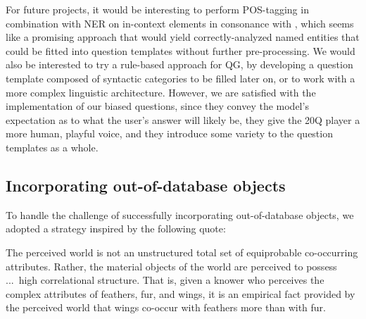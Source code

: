 \documentclass[11pt,a4paper]{article}
\begin{document}
For future projects, it would be interesting to perform POS-tagging in combination with NER on in-context elements in consonance with \citet{Mandasari2019}, which seems like a promising approach that would yield correctly-analyzed named entities that could be fitted into question templates without further pre-processing. We would also be interested to try a rule-based approach for QG, by developing a question template composed of syntactic categories to be filled later on, or to work with a more complex linguistic architecture. However, we are satisfied with the implementation of our biased questions, since they convey the model's expectation as to what the user's answer will likely be, they give the 20Q player a more human, playful voice, and they introduce some variety to the question templates as a whole.

\subsection{Incorporating out-of-database objects}
\label{subsec:out-of-db}

To handle the challenge of successfully incorporating out-of-database objects, we adopted a strategy inspired by the following quote:

\begin{displayquote}
The perceived world is not an unstructured total set of equiprobable co-occurring attributes. Rather, the material objects of the world are perceived to possess ...\ high correlational structure.
That is, given a knower who perceives the complex attributes of feathers, fur, and wings, it is an empirical fact provided by the perceived world that wings co-occur with feathers more than with fur. \citep[29]{Rosch1978}
\end{displayquote}
\end{document}
